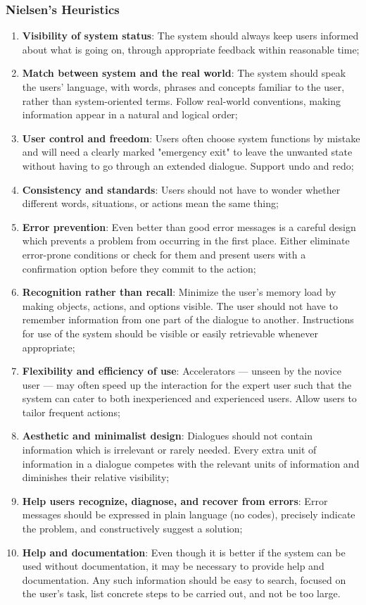\subsubsection{Nielsen's Heuristics}
\begin{enumerate}
	\item \textbf{Visibility of system status}: The system should always keep users informed about what is going on, through appropriate feedback within reasonable time;
	\item \textbf{Match between system and the real world}: The system should speak the users' language, with words, phrases and concepts familiar to the user, rather than system-oriented terms. Follow real-world conventions, making information appear in a natural and logical order;
	\item \textbf{User control and freedom}: Users often choose system functions by mistake and will need a clearly marked "emergency exit" to leave the unwanted state without having to go through an extended dialogue. Support undo and redo;
	\item \textbf{Consistency and standards}: Users should not have to wonder whether different words, situations, or actions mean the same thing;
	\item \textbf{Error prevention}: Even better than good error messages is a careful design which prevents a problem from occurring in the first place. Either eliminate error-prone conditions or check for them and present users with a confirmation option before they commit to the action;
	\item \textbf{Recognition rather than recall}: Minimize the user's memory load by making objects, actions, and options visible. The user should not have to remember information from one part of the dialogue to another. Instructions for use of the system should be visible or easily retrievable whenever appropriate;
	\item \textbf{Flexibility and efficiency of use}: Accelerators — unseen by the novice user — may often speed up the interaction for the expert user such that the system can cater to both inexperienced and experienced users. Allow users to tailor frequent actions;
	\item \textbf{Aesthetic and minimalist design}: Dialogues should not contain information which is irrelevant or rarely needed. Every extra unit of information in a dialogue competes with the relevant units of information and diminishes their relative visibility;
	\item \textbf{Help users recognize, diagnose, and recover from errors}: Error messages should be expressed in plain language (no codes), precisely indicate the problem, and constructively suggest a solution;
	\item \textbf{Help and documentation}: Even though it is better if the system can be used without documentation, it may be necessary to provide help and documentation. Any such information should be easy to search, focused on the user's task, list concrete steps to be carried out, and not be too large.
\end{enumerate}

